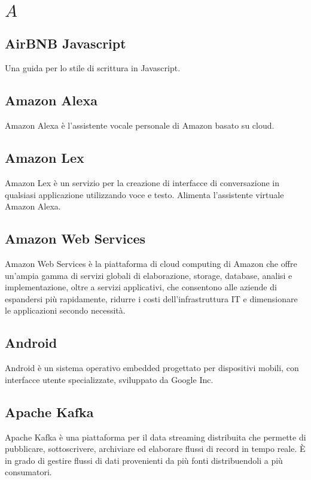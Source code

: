 \section{\quad$A\quad$}

\subsection{AirBNB Javascript}
Una guida per lo stile di scrittura in Javascript.

\subsection{Amazon Alexa}
Amazon Alexa è l’assistente vocale personale di Amazon basato su cloud.

\subsection{Amazon Lex}
Amazon Lex è un servizio per la creazione di interfacce di conversazione in qualsiasi applicazione utilizzando voce e testo. Alimenta l'assistente virtuale Amazon Alexa.

\subsection{Amazon Web Services}
Amazon Web Services è la piattaforma di cloud computing di Amazon che offre un'ampia gamma di servizi globali di elaborazione, storage, database, analisi e implementazione, oltre a servizi applicativi, che consentono alle aziende di espandersi più rapidamente, ridurre i costi dell'infrastruttura IT e dimensionare le applicazioni secondo necessità.

\subsection{Android}
Android è un sistema operativo embedded progettato per dispositivi mobili, con interfacce utente specializzate, sviluppato da Google Inc.

\subsection{Apache Kafka}
Apache Kafka è una piattaforma per il data streaming distribuita che permette di pubblicare, sottoscrivere, archiviare ed elaborare flussi di record in tempo reale. È in grado di gestire flussi di dati provenienti da più fonti distribuendoli a più consumatori.

